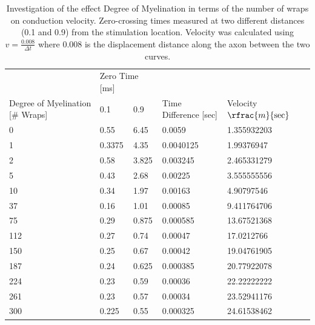 \documentclass[12pt]{article}
\begin{document}
\begin{table}[h!]
\begin{tabular}{|l|l|l|l|l|}
                  & \multicolumn{2}{l}{Zero Time [ms]} &                     &                     \\
Degree of Myelination [\# Wraps] & 0.1              & 0.9             & Time Difference [sec] & Velocity $\rfrac{m}{\text{sec}}$ \\ \hline\hline
0  & 0.55   & 6.45  & 0.0059    & 1.355932203 \\
1  & 0.3375 & 4.35  & 0.0040125 & 1.99376947  \\
2  & 0.58   & 3.825 & 0.003245  & 2.465331279 \\
5  & 0.43   & 2.68  & 0.00225   & 3.555555556 \\
10 & 0.34   & 1.97  & 0.00163   & 4.90797546  \\
37                          & 0.16  & 1.01  & 0.00085               & 9.411764706        \\
75                          & 0.29  & 0.875 & 0.000585              & 13.67521368        \\
112                         & 0.27  & 0.74  & 0.00047               & 17.0212766         \\
150                         & 0.25  & 0.67  & 0.00042               & 19.04761905        \\
187                         & 0.24  & 0.625 & 0.000385              & 20.77922078        \\
224                         & 0.23  & 0.59  & 0.00036               & 22.22222222        \\
261                         & 0.23  & 0.57  & 0.00034               & 23.52941176        \\
300                         & 0.225 & 0.55  & 0.000325              & 24.61538462              
\end{tabular}
\caption{Investigation of the effect Degree of Myelination in terms of the number of wraps on conduction velocity. Zero-crossing times measured at two different distances (0.1 and 0.9) from the stimulation location. Velocity was calculated using $v = \frac{0.008}{\Delta t}$ where 0.008 is the displacement distance along the axon between the two curves. }
\label{table:2a}
\end{table}



\end{document}
